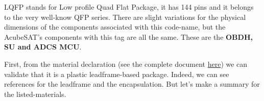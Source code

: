\documentclass[final]{cubedoc}
\begin{document}
	
	LQFP stands for Low profile Quad Flat Package, it has 144 pins and it belongs to the very well-know QFP series. There are slight variations for the physical dimensions of the components associated with this code-name, but the AcubeSAT's components with this tag are all the same. These are the \textbf{OBDH, SU and ADCS MCU}.
	
	First, from the material declaration (see the complete document \href{https://web.archive.org/web/20200818131830/https://www.st.com/content/ccc/resource/quality_and_reliability/quality_certificate/material_declaration/group3/be/7d/54/2a/11/68/4e/ad/DM00442253/files/P41A_470XXXY_signed.pdf/jcr:content/translations/en.P41A_470XXXY_signed.pdf}{here}) we can validate that it is a plastic leadframe-based package. Indeed, we can see references for the leadframe and the encapsulation. But let's make a summary for the listed-materials.
	
	
\end{document}
